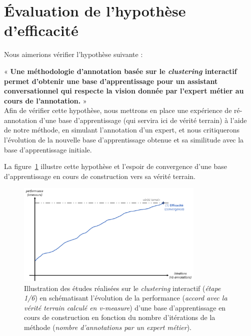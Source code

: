 \section{Évaluation de l'hypothèse d'efficacité}
\label{section:4.1-HYPOTHESE-EFFICACITE}
	
	Nous aimerions vérifier l'hypothèse suivante :

	\begin{tcolorbox}[
		title=\faVial~\textbf{Hypothèse d'efficacité}~\faVial,
		colback=colorTcolorboxHypothesis!15,
		colframe=colorTcolorboxHypothesis!75,
		width=\linewidth
	]
		« \textbf{
			Une méthodologie d'annotation basée sur le \textit{clustering} interactif permet d'obtenir une base d'apprentissage pour un assistant conversationnel qui respecte la vision donnée par l'expert métier au cours de l'annotation.
		} » \\
		
		Afin de vérifier cette hypothèse, nous mettrons en place une expérience de ré-annotation d'une base d'apprentissage (qui servira ici de vérité terrain) à l'aide de notre méthode, en simulant l'annotation d'un expert, et nous critiquerons l'évolution de la nouvelle base d'apprentissage obtenue et sa similitude avec la base d'apprentissage initiale.
		
		La figure~\ref{figure:4.1-HYPOTHESE-EFFICACITE} illustre cette hypothèse et l'espoir de convergence d'une base d'apprentissage en cours de construction vers sa vérité terrain.
		\begin{figure}[H]  %
			\centering
			\includegraphics[width=0.8\textwidth]{figures/hypotheses-01-efficacite}
			\caption{Illustration des études réalisées sur le \textit{clustering} interactif (\textit{étape 1/6}) en schématisant l'évolution de la performance (\textit{accord avec la vérité terrain calculé en v-measure}) d'une base d'apprentissage en cours de construction en fonction du nombre d'itérations de la méthode (\textit{nombre d'annotations par un expert métier}).}
			\label{figure:4.1-HYPOTHESE-EFFICACITE}
		\end{figure}

	\end{tcolorbox}
	
